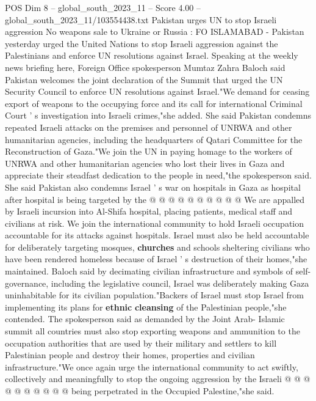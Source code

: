 \begin{textsample}{POS Dim 8 – global\_south\_2023\_11 – Score 4.00 – global\_south\_2023\_11/103554438.txt}  \label{ex:f8_pos_366}
Pakistan urges UN to stop Israeli aggression No weapons sale to Ukraine or Russia : FO ISLAMABAD - Pakistan yesterday urged the United Nations to stop Israeli aggression against the Palestinians and enforce UN resolutions against Israel.
Speaking at the weekly news briefing here, Foreign Office spokesperson Mumtaz Zahra Baloch said Pakistan welcomes the joint declaration of the Summit that urged the UN Security Council to enforce UN resolutions against Israel."We demand for ceasing export of weapons to the occupying force and its call for international Criminal Court ' s investigation into Israeli crimes,"she added.
She said Pakistan condemns repeated Israeli attacks on the premises and personnel of UNRWA and other humanitarian agencies, including the headquarters of Qatari Committee for the Reconstruction of Gaza."We join the UN in paying homage to the workers of UNRWA and other humanitarian agencies who lost their lives in Gaza and appreciate their steadfast dedication to the people in need,"the spokesperson said.
She said Pakistan also condemns Israel ' s war on hospitals in Gaza as hospital after hospital is being targeted by the @ @ @ @ @ @ @ @ @ @ We are appalled by Israeli incursion into Al-Shifa hospital, placing patients, medical staff and civilians at risk.
We join the international community to hold Israeli occupation accountable for its attacks against hospitals.
Israel must also be held accountable for deliberately targeting mosques, \textbf{churches} and schools sheltering civilians who have been rendered homeless because of Israel ' s destruction of their homes,"she maintained.
Baloch said by decimating civilian infrastructure and symbols of self-governance, including the legislative council, Israel was deliberately making Gaza uninhabitable for its civilian population."Backers of Israel must stop Israel from implementing its plans for \textbf{ethnic} \textbf{cleansing} of the Palestinian people,"she contended.
The spokesperson said as demanded by the Joint Arab- Islamic summit all countries must also stop exporting weapons and ammunition to the occupation authorities that are used by their military and settlers to kill Palestinian people and destroy their homes, properties and civilian infrastructure."We once again urge the international community to act swiftly, collectively and meaningfully to stop the ongoing aggression by the Israeli @ @ @ @ @ @ @ @ @ @ being perpetrated in the Occupied Palestine,"she said.

\end{textsample}
